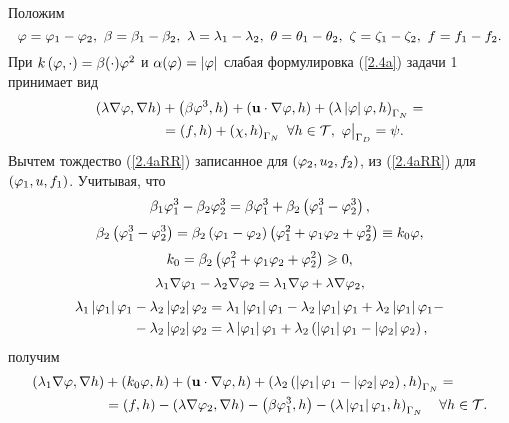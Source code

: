 Положим
\begin{equation}
    \label{sign}
    \varphi = \varphi_1 - \varphi_2, ~ 
    \beta = \beta_1 - \beta_2, ~
    \lambda = \lambda_1 - \lambda_2, ~
    \theta = \theta_1 - \theta_2, ~ 
    \zeta = \zeta_1 - \zeta_2, ~
    f = f_1 - f_2.
\end{equation}
При $k \left( \varphi, \cdot \right) = \beta(\cdot) \varphi^2$ и $\alpha (\varphi) = \left\vert \varphi \right\vert$ слабая формулировка (\ref{2.4a}) задачи 1 принимает вид 
\begin{equation}
    \label{2.4aRR}
    \begin{split}
        \left( \lambda \nabla \varphi, \nabla h \right) 
        &+ \left( \beta \varphi^3, h \right) 
        + \left( \mathbf{u} \cdot \nabla \varphi, h \right) 
        + \left( \lambda \left\vert \varphi \right\vert \varphi, h \right)_{\Gamma_N} = \\
        &= \left( f,h \right) + \left( \chi, h \right)_{\Gamma_N}
        ~ \forall h \in {\mathcal{T}}, ~ \varphi\bigl. \bigr\vert_{\Gamma_D} = \psi.
    \end{split}
\end{equation} 
Вычтем тождество (\ref{2.4aRR}) записанное для $\left( \varphi_2, u_2, f_2 \right)$, из (\ref{2.4aRR}) для $\left( \varphi_1, u, f_1 \right)$. 
Учитывая, что 
\[ \beta_1 \varphi_1^3 - \beta_2 \varphi_2^3 = \beta \varphi_1^3 + \beta_2 \left( \varphi_1^3- \varphi_2^3 \right), \]
\[ 
    \beta_2 \left( \varphi_1^3 - \varphi_2^3 \right) = 
    \beta_2 \left( \varphi_1 - \varphi_2 \right) \left( \varphi_1^2 + \varphi_1 \varphi_2 + \varphi_2^2 \right) \equiv k_0 \varphi,
\] 
\[ k_0 = \beta_2 \left( \varphi_1^2 + \varphi_1 \varphi_2 + \varphi_2^2 \right) \geqslant 0, \]
\[
    \lambda_1 \nabla \varphi_1 - \lambda_2 \nabla \varphi_2 = 
    \lambda_1 \nabla \varphi + \lambda \nabla \varphi_2,
\]
\[
    \begin{split}
        \lambda_1 \left\vert \varphi_1 \right\vert \varphi_1 
        &- \lambda_2 \left\vert \varphi_2 \right\vert \varphi_2 
        = \lambda_1 \left\vert \varphi_1 \right\vert \varphi_1
        - \lambda_2 \left\vert \varphi_1 \right\vert \varphi_1 
        + \lambda_2 \left\vert \varphi_1 \right\vert \varphi_1 - \\
        &- \lambda_2 \left\vert \varphi_2 \right\vert \varphi_2
        = \lambda \left\vert \varphi_1 \right\vert \varphi_1 
        + \lambda_2 \left(  \left\vert \varphi_1 \right\vert \varphi_1 
        - \left\vert \varphi_2 \right\vert \varphi_2  \right),
    \end{split}
\]
получим
\begin{equation}
    \label{weakminus}
    \begin{split}
        \left( \lambda_1 \nabla \varphi, \nabla h \right) 
        &+ \left( k_0 \varphi, h \right) 
        + \left( \mathbf{u} \cdot \nabla \varphi, h \right) 
        + \left( 
            \lambda_2 \left( 
                \left\vert \varphi_1 \right\vert \varphi_1 - \left\vert \varphi_2 \right\vert \varphi_2
             \right) ,h
         \right)_{\Gamma_N} = \\
        &= \left( f, h \right) - \left( \lambda \nabla \varphi_2, \nabla h \right) 
        - \left( \beta \varphi_1^3, h \right) 
        - \left( \lambda \left\vert \varphi_1 \right\vert \varphi_1, h \right)_{\Gamma_N} \quad 
        \forall h \in {\mathcal{T}}.
    \end{split}
\end{equation}

